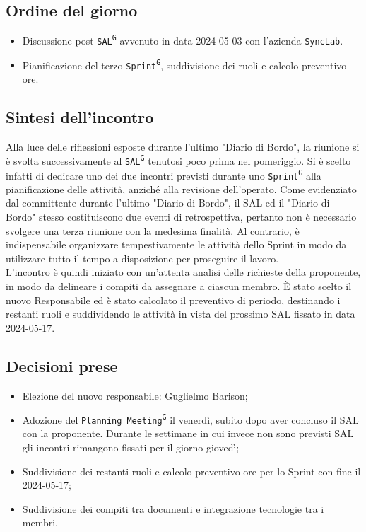 \documentclass[8pt]{article}
\newcommand{\glossterm}[1]{#1\textsuperscript{G}} %
\begin{document}
\subsection{Ordine del giorno}
\begin{itemize}
	\setlength\itemsep{0em}
	\item Discussione post \texttt{\glossterm{SAL}} avvenuto in data 2024-05-03 con l'azienda \texttt{SyncLab}.
	\item Pianificazione del terzo \texttt{\glossterm{Sprint}}, suddivisione dei ruoli e calcolo preventivo ore.
\end{itemize}
\subsection{Sintesi dell'incontro}
Alla luce delle riflessioni esposte durante l'ultimo "Diario di Bordo", la riunione si è svolta successivamente al \texttt{\glossterm{SAL}} tenutosi poco prima nel pomeriggio. Si è scelto infatti di dedicare uno dei due incontri previsti durante uno \texttt{\glossterm{Sprint}} alla pianificazione delle attività, anziché alla revisione dell'operato. Come evidenziato dal committente durante l'ultimo "Diario di Bordo", il SAL ed il "Diario di Bordo" stesso costituiscono due eventi di retrospettiva, pertanto non è necessario svolgere una terza riunione con la medesima finalità. Al contrario, è indispensabile organizzare tempestivamente le attività dello Sprint in modo da utilizzare tutto il tempo a disposizione per proseguire il lavoro. \\
L'incontro è quindi iniziato con un'attenta analisi delle richieste della proponente, in modo da delineare i compiti da assegnare a ciascun membro. È stato scelto il nuovo Responsabile ed è stato calcolato il preventivo di periodo, destinando i restanti ruoli e suddividendo le attività in vista del prossimo SAL fissato in data 2024-05-17.

\subsection{Decisioni prese}
\begin{itemize}
	\setlength\itemsep{0em}
	\item Elezione del nuovo responsabile: Guglielmo Barison;
        \item Adozione del \texttt{\glossterm{Planning Meeting}} il venerdì, subito dopo aver concluso il SAL con la proponente. Durante le settimane in cui invece non sono previsti SAL gli incontri rimangono fissati per il giorno giovedì;
	\item Suddivisione dei restanti ruoli e calcolo preventivo ore per lo Sprint con fine il 2024-05-17;
	\item Suddivisione dei compiti tra documenti e integrazione tecnologie tra i membri.
\end{itemize}
\newpage
\end{document}
